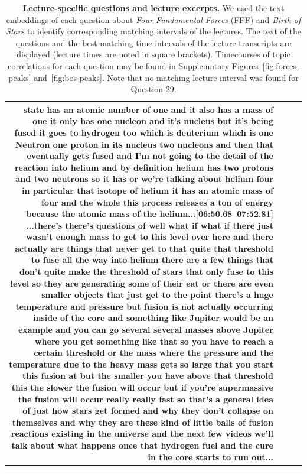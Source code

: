 \documentclass[10pt]{article}
\begin{document}
\begin{tiny}
\begin{longtable}{|r|p{0.375in}|p{1.275in}|p{3.5in}|}
state has an atomic number of one and it also has a mass of one it only has one nucleon and it's nucleus but it's being fused it goes to hydrogen too which is deuterium which is one Neutron one proton in its nucleus two nucleons and then that eventually gets fused and I'm not going to the detail of the reaction into helium and by definition helium has two protons and two neutrons so it has or we're talking about helium four in particular that isotope of helium it has an atomic mass of four and the whole this process releases a ton of energy because the atomic mass of the helium...\newline\textbf{[06:50.68--07:52.81]} ...there's there's questions of well what if what if there just wasn't enough mass to get to this level over here and there actually are things that never get to that quite that threshold to fuse all the way into helium there are a few things that don't quite make the threshold of stars that only fuse to this level so they are generating some of their eat or there are even smaller objects that just get to the point there's a huge temperature and pressure but fusion is not actually occurring inside of the core and something like Jupiter would be an example and you can go several several masses above Jupiter where you get something like that so you have to reach a certain threshold or the mass where the pressure and the temperature due to the heavy mass gets so large that you start this fusion at but the smaller you have above that threshold this the slower the fusion will occur but if you're supermassive the fusion will occur really really fast so that's a general idea of just how stars get formed and why they don't collapse on themselves and why they are these kind of little balls of fusion reactions existing in the universe and the next few videos we'll talk about what happens once that hydrogen fuel and the cure in the core starts to run out... \\\hline

\caption{\textbf{Lecture-specific questions and lecture excerpts.} We used the
text embeddings of each question about \textit{Four Fundamental Forces} (FFF)
and \textit{Birth of Stars} to identify corresponding matching intervals of the
lectures. The text of the questions and the best-matching time intervals of the
lecture transcripts are displayed (lecture times are noted in square brackets).
Timecourses of topic correlations for each question may be found in
Supplemntary Figures~\ref{fig:forces-peaks} and~\ref{fig:bos-peaks}. Note that
no matching lecture interval was found for Question 29.} 
\label{tab:matches}
\end{longtable}
\end{tiny}
\end{document}
